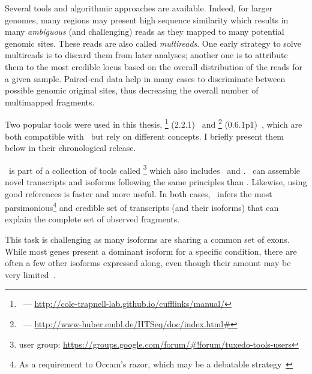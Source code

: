 Several tools and algorithmic approaches are available.
Indeed, for larger genomes, many regions may present high sequence similarity
which results in many \emph{ambiguous} (and challenging) reads as they mapped to
many potential genomic sites. These reads are also called \emph{multireads}.
One early strategy to solve multireads is to discard them from later analyses;
another one is to attribute them to the most credible locus based on
the overall distribution of the reads for a given sample. 
Paired-end data help in many cases to discriminate between possible genomic
original sites, thus decreasing the overall number of multimapped fragments.

Two popular tools were used in this thesis,
\cuffl\footnote{\cuffl\ ---
\href{http://cole-trapnell-lab.github.io/ufflinks/manual/}%
{http://cole-trapnell-lab.github.io/cufflinks/manual/}} (2.2.1)~ and
\htseq\footnote{\htseq\ ---
\href{http://www-huber.embl.de/HTSeq/doc/index.html\#}%
{http://www-huber.embl.de/HTSeq/doc/index.html\#}} (0.6.1p1)~,
which are both compatible with \toph\ but rely on different concepts.
I briefly present them below in their chronological release.

\label{minisec:Cufflinks}
\cuffl\ is part of a collection of tools called
\footnote{ user group:
\href{https://groups.google.com/forum/\#!forum/tuxedo-tools-users}%
{https://groups.google.com/forum/\#!forum/tuxedo-tools-users}} which also includes
\toph\ and .
\cuffl\ can assemble
 novel transcripts and isoforms following the same principles
than \toph. Likewise, using good references is faster and more useful.
In both cases, \cuffl\ infers the most parsimonious\footnote{As a requirement to
Occam's razor, which may be a debatable strategy~}
and credible set of transcripts (and their isoforms) that can explain the
complete set of observed fragments.

This task is challenging as many isoforms are sharing a common set of exons.
While most genes present a dominant isoform for a specific condition,
there are often a few other isoforms expressed along, even though their amount
may be very limited~.

